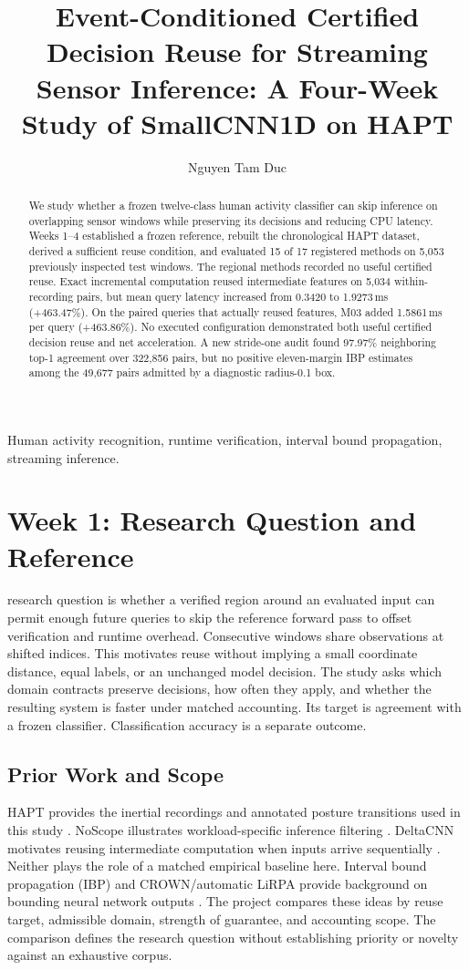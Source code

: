 \documentclass[journal]{IEEEtran}
\title{Event-Conditioned Certified Decision Reuse for Streaming Sensor Inference: A Four-Week Study of SmallCNN1D on HAPT}
\author{Nguyen Tam Duc}
\begin{document}
\maketitle
\begin{abstract}
We study whether a frozen twelve-class human activity classifier can skip inference on overlapping sensor windows while preserving its decisions and reducing CPU latency. Weeks 1--4 established a frozen reference, rebuilt the chronological HAPT dataset, derived a sufficient reuse condition, and evaluated 15 of 17 registered methods on 5,053 previously inspected test windows. The regional methods recorded no useful certified reuse. Exact incremental computation reused intermediate features on 5,034 within-recording pairs, but mean query latency increased from 0.3420 to 1.9273\,ms (+463.47\%). On the paired queries that actually reused features, M03 added 1.5861\,ms per query (+463.86\%). No executed configuration demonstrated both useful certified decision reuse and net acceleration. A new stride-one audit found 97.97\% neighboring top-1 agreement over 322,856 pairs, but no positive eleven-margin IBP estimates among the 49,677 pairs admitted by a diagnostic radius-0.1 box.
\end{abstract}
\begin{IEEEkeywords}
Human activity recognition, runtime verification, interval bound propagation, streaming inference.
\end{IEEEkeywords}
\section{Week 1: Research Question and Reference}
 research question is whether a verified region around an evaluated input can permit enough future queries to skip the reference forward pass to offset verification and runtime overhead. Consecutive windows share observations at shifted indices. This motivates reuse without implying a small coordinate distance, equal labels, or an unchanged model decision. The study asks which domain contracts preserve decisions, how often they apply, and whether the resulting system is faster under matched accounting. Its target is agreement with a frozen classifier. Classification accuracy is a separate outcome.
\subsection{Prior Work and Scope}
HAPT provides the inertial recordings and annotated posture transitions used in this study \cite{reyesortiz2015hapt,reyes2016transition}. NoScope illustrates workload-specific inference filtering \cite{kang2017noscope}. DeltaCNN motivates reusing intermediate computation when inputs arrive sequentially \cite{parger2022deltacnn}. Neither plays the role of a matched empirical baseline here. Interval bound propagation (IBP) and CROWN/automatic LiRPA provide background on bounding neural network outputs \cite{gowal2018ibp,zhang2018crown,xu2020automatic}. The project compares these ideas by reuse target, admissible domain, strength of guarantee, and accounting scope. The comparison defines the research question without establishing priority or novelty against an exhaustive corpus.
\end{document}
